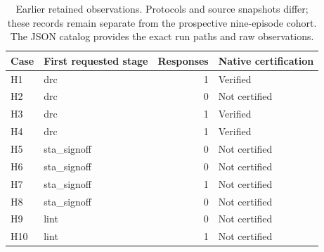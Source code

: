 \begin{table}[htbp]\centering\small\setlength{\tabcolsep}{4pt}
\caption{Earlier retained observations. Protocols and source snapshots differ; these records remain separate from the prospective nine-episode cohort. The JSON catalog provides the exact run paths and raw observations.}\label{tab:history}
\begin{tabular}{@{}llrl@{}}\toprule
Case & First requested stage & Responses & Native certification \\
\midrule
H1 & drc & 1 & Verified \\
H2 & drc & 0 & Not certified \\
H3 & drc & 1 & Verified \\
H4 & drc & 1 & Verified \\
H5 & sta\_signoff & 0 & Not certified \\
H6 & sta\_signoff & 0 & Not certified \\
H7 & sta\_signoff & 1 & Not certified \\
H8 & sta\_signoff & 0 & Not certified \\
H9 & lint & 0 & Not certified \\
H10 & lint & 1 & Not certified \\
\bottomrule\end{tabular}\end{table}
